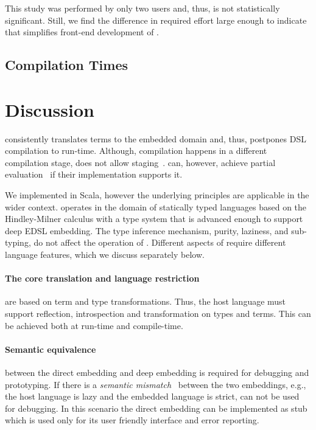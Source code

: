 This study was performed by only two users and, thus, is not statistically
significant. Still, we find the difference in required effort large enough to indicate that \yy
simplifies front-end development of \edsls.

\subsection{Compilation Times}
\label{sec:compilation-times}

\section{Discussion}
\label{sec:other-languages}


\yy consistently translates terms to the embedded domain and, thus, postpones
DSL compilation to run-time. Although, compilation happens in a different
compilation stage, \yy does not allow staging~\cite{taha_multi-stage_1997}.
\edsls can, however, achieve partial evaluation~\cite{jones1993partial} if their
implementation supports it.

We implemented \yy in Scala, however the underlying principles are applicable
in the wider context. \yy operates in the domain of statically typed languages
based on the Hindley-Milner calculus with a type system that is advanced enough
to support deep EDSL embedding. The type inference mechanism, purity, laziness,
and sub-typing, do not affect the operation of \yy. Different aspects of \yy
require different language features, which we discuss separately below.

\paragraph{The core translation and language restriction} are based on term and
type transformations. Thus, the host language must support reflection,
introspection and transformation on types and terms. This can be achieved both
at run-time and compile-time.

\paragraph{Semantic equivalence} between the direct embedding and deep embedding
is required for debugging and prototyping. If there is a \emph{semantic mismatch}~\cite{czarnecki_dsl_2004}
 between the two embeddings, e.g., the host language is lazy and the embedded
 language is strict, \yy can not be used for debugging. In this scenario the
 direct embedding can be implemented as stub which is used only for its user
 friendly interface and error reporting.

